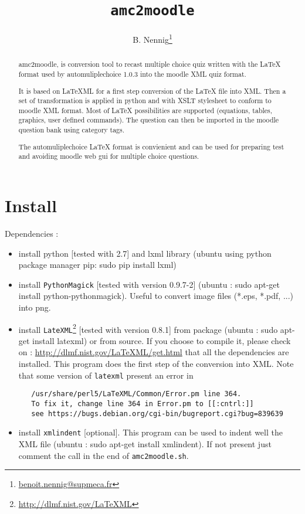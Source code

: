 \documentclass[a4paper]{article}
\title{\texttt{amc2moodle}}
\author{B. Nennig\footnote{\url{benoit.nennig@supmeca.fr}}}
\begin{document}
\maketitle 

\begin{abstract}
amc2moodle, is conversion tool to recast multiple choice quiz written with the LaTeX format used by automuliplechoice 1.0.3 into the moodle XML quiz format.

It is based on LaTeXML for a first step conversion of the LaTeX file into XML. Then a set of transformation is applied in python and with XSLT stylesheet to conform to moodle XML format. Most of LaTeX possibilities are supported (equations, tables, graphics, user defined commands). The question can then be imported in the moodle question bank using category tags.

The automuliplechoice LaTeX format is convienient and can be used for preparing test and avoiding moodle web gui for multiple choice questions.
\end{abstract}


\tableofcontents	
\newpage
\section{Install}
Dependencies :
\begin{itemize}
	\item install python [tested with 2.7] and lxml library (ubuntu using python package manager pip: sudo pip install lxml)
    \item install \texttt{PythonMagick} [tested with version 0.9.7-2] (ubuntu : sudo apt-get install python-pythonmagick). Useful to convert image files (*.eps, *.pdf, ...) into png.
    \item install \texttt{LateXML}\footnote{\url{http://dlmf.nist.gov/LaTeXML}} [tested with version 0.8.1] from package (ubuntu : sudo apt-get install latexml) or from source. If you choose to compile it, please check on :   
     \url{http://dlmf.nist.gov/LaTeXML/get.html}  that all the dependencies are installed. This program does the first step of the conversion into XML. Note that some version of \texttt{latexml} present an error in  
\begin{verbatim}
   /usr/share/perl5/LaTeXML/Common/Error.pm line 364.  
   To fix it, change line 364 in Error.pm to [[:cntrl:]]
   see https://bugs.debian.org/cgi-bin/bugreport.cgi?bug=839639
     \end{verbatim}
    \item install \texttt{xmlindent} [optional]. This program can be used to indent well the XML file (ubuntu : sudo apt-get install xmlindent). If not present just comment the call in the end of \texttt{amc2moodle.sh}.
\end{itemize}
\end{document}
